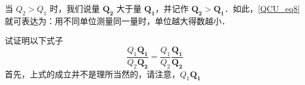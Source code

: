 当 $Q_2>Q_1$ 时，我们说量 $\boldsymbol{Q_2}$ 大于量 $\boldsymbol{Q_1}$，并记作 $\boldsymbol{Q_2}>\boldsymbol{Q_1}$．如此，\autoref{QCU_eq8} 就可表达为：用不同单位测量同一量时，单位越大得数越小．
\begin{example}{}
试证明以下式子
\begin{equation}
\frac{Q_1\boldsymbol{Q_1}}{Q_2\boldsymbol{Q_2}}=\frac{Q_1}{Q_2}\frac{\boldsymbol{Q_1}}{\boldsymbol{Q_2}}
\end{equation}
首先，上式的成立并不是理所当然的，请注意，$Q_1\boldsymbol{Q_1}$ 
\end{example}